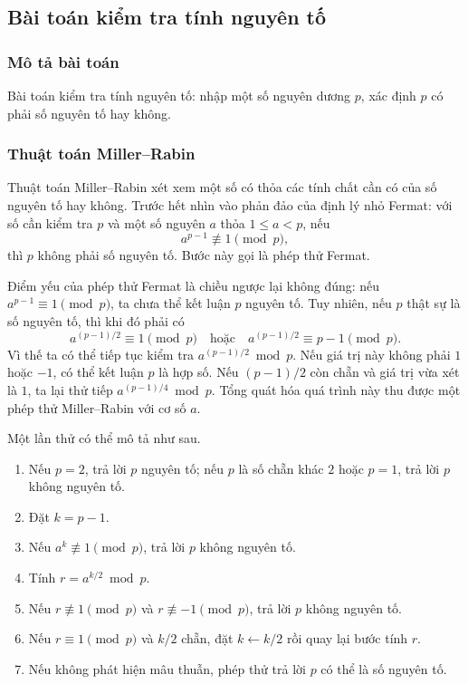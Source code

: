 \documentclass[11pt]{article}
\begin{document}
\subsection{Bài toán kiểm tra tính nguyên tố}

\subsubsection{Mô tả bài toán}

Bài toán kiểm tra tính nguyên tố: nhập một số nguyên dương \(p\), xác định
\(p\) có phải số nguyên tố hay không.

\subsubsection{Thuật toán Miller--Rabin}

Thuật toán Miller--Rabin xét xem một số có thỏa các tính chất cần có của số
nguyên tố hay không. Trước hết nhìn vào phản đảo của định lý nhỏ Fermat: với
số cần kiểm tra \(p\) và một số nguyên \(a\) thỏa \(1\le a<p\), nếu
\[
  a^{p-1}\not\equiv 1 \pmod p,
\]
thì \(p\) không phải số nguyên tố. Bước này gọi là phép thử Fermat.

Điểm yếu của phép thử Fermat là chiều ngược lại không đúng: nếu
\(a^{p-1}\equiv 1\pmod p\), ta chưa thể kết luận \(p\) nguyên tố. Tuy nhiên,
nếu \(p\) thật sự là số nguyên tố, thì khi đó phải có
\[
  a^{(p-1)/2}\equiv 1 \pmod p
  \quad\text{hoặc}\quad
  a^{(p-1)/2}\equiv p-1 \pmod p.
\]
Vì thế ta có thể tiếp tục kiểm tra \(a^{(p-1)/2}\bmod p\). Nếu giá trị này
không phải \(1\) hoặc \(-1\), có thể kết luận \(p\) là hợp số. Nếu
\((p-1)/2\) còn chẵn và giá trị vừa xét là \(1\), ta lại thử tiếp
\(a^{(p-1)/4}\bmod p\). Tổng quát hóa quá trình này thu được một phép thử
Miller--Rabin với cơ số \(a\).

Một lần thử có thể mô tả như sau.
\begin{enumerate}
  \item Nếu \(p=2\), trả lời \(p\) nguyên tố; nếu \(p\) là số chẵn khác \(2\)
  hoặc \(p=1\), trả lời \(p\) không nguyên tố.
  \item Đặt \(k=p-1\).
  \item Nếu \(a^k\not\equiv 1\pmod p\), trả lời \(p\) không nguyên tố.
  \item Tính \(r=a^{k/2}\bmod p\).
  \item Nếu \(r\not\equiv 1\pmod p\) và \(r\not\equiv -1\pmod p\), trả lời
  \(p\) không nguyên tố.
  \item Nếu \(r\equiv 1\pmod p\) và \(k/2\) chẵn, đặt \(k\gets k/2\) rồi quay
  lại bước tính \(r\).
  \item Nếu không phát hiện mâu thuẫn, phép thử trả lời \(p\) có thể là số
  nguyên tố.
\end{enumerate}
\end{document}
